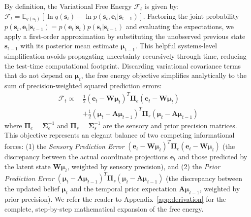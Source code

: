 By definition, the Variational Free Energy $\mathcal{F}_t$ is given by: $\mathcal{F}_t = \mathbb{E}_{q(\mathbf{s}_t)} \left[ \ln q(\mathbf{s}_t) - \ln p(\mathbf{s}_t, \mathbf{e}_t | \mathbf{s}_{t-1}) \right]$. Factoring the joint probability $p(\mathbf{s}_t, \mathbf{e}_t | \mathbf{s}_{t-1}) = p(\mathbf{e}_t | \mathbf{s}_t) p(\mathbf{s}_t | \mathbf{s}_{t-1})$ and evaluating the expectations, we apply a first-order approximation by substituting the unobserved previous state $\mathbf{s}_{t-1}$ with its posterior mean estimate $\mathbf{\mu}_{t-1}$. This helpful systems-level simplification avoids propagating uncertainty recursively through time, reducing the test-time computational footprint. Discarding variational covariance terms that do not depend on $\mathbf{\mu}_t$, the free energy objective simplifies analytically to the sum of precision-weighted squared prediction errors:
\begin{equation}
\begin{aligned}
\mathcal{F}_t \propto \, &\frac{1}{2} (\mathbf{e}_t - \mathbf{W}\mathbf{\mu}_t)^T \mathbf{\Pi}_e (\mathbf{e}_t - \mathbf{W}\mathbf{\mu}_t) \\
&+ \frac{1}{2} (\mathbf{\mu}_t - \mathbf{A}\mathbf{\mu}_{t-1})^T \mathbf{\Pi}_s (\mathbf{\mu}_t - \mathbf{A}\mathbf{\mu}_{t-1})
\end{aligned}
\end{equation}
where $\mathbf{\Pi}_e = \mathbf{\Sigma}_e^{-1}$ and $\mathbf{\Pi}_s = \mathbf{\Sigma}_s^{-1}$ are the sensory and prior precision matrices. This objective represents an elegant balance of two competing informational forces: (1) the \emph{Sensory Prediction Error} $(\mathbf{e}_t - \mathbf{W}\mathbf{\mu}_t)^T \mathbf{\Pi}_e (\mathbf{e}_t - \mathbf{W}\mathbf{\mu}_t)$ (the discrepancy between the actual coordinate projections $\mathbf{e}_t$ and those predicted by the latent state $\mathbf{W}\mathbf{\mu}_t$, weighted by sensory precision), and (2) the \emph{Prior Prediction Error} $(\mathbf{\mu}_t - \mathbf{A}\mathbf{\mu}_{t-1})^T \mathbf{\Pi}_s (\mathbf{\mu}_t - \mathbf{A}\mathbf{\mu}_{t-1})$ (the discrepancy between the updated belief $\mathbf{\mu}_t$ and the temporal prior expectation $\mathbf{A}\mathbf{\mu}_{t-1}$, weighted by prior precision). We refer the reader to Appendix~\ref{app:derivation} for the complete, step-by-step mathematical expansion of the free energy.

